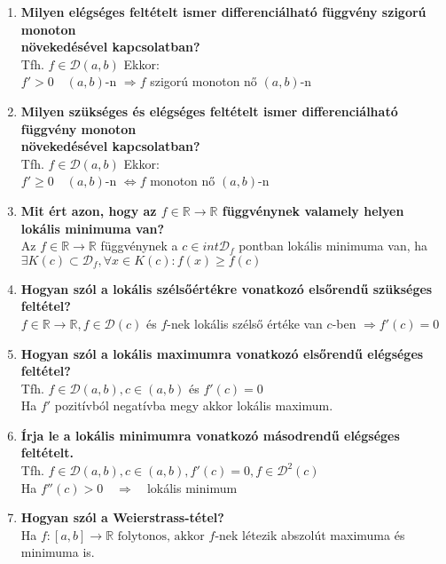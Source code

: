 \documentclass[a4paper,11pt]{article}
\begin{document}
\def\R{\mathbb{R}}
\def\cab{\in C[a,b]}
\def\dab{\in\D(a,b)}
\def\rtr{\R\to\R}
\def\D{\mathcal{D}}
\def\fda{f\in\D(a)}
\begin{enumerate}
	\item \textbf{Milyen elégséges feltételt ismer differenciálható függvény szigorú monoton \\ növekedésével kapcsolatban?}\\[0.2cm]Tfh. $f\dab$ Ekkor: \\[0.1cm]\hspace*{0.3cm} $f'>0\quad (a,b)$-n $\Rightarrow f$ szigorú monoton nő $(a,b)$-n
	\item \textbf{Milyen szükséges és elégséges feltételt ismer differenciálható függvény monoton \\ növekedésével kapcsolatban?}\\[0.2cm]Tfh. $f\dab$ Ekkor: \\[0.2cm]\hspace*{0.3cm} $f'\geq0\quad(a,b)$-n $\Leftrightarrow f$ monoton nő $(a,b)$-n
	\item \textbf{Mit ért azon, hogy az $f\in\rtr$ függvénynek valamely helyen lokális minimuma van?}\\[0.2cm]Az $f\in\rtr$ függvénynek a $c\in int\D_f$ pontban lokális minimuma van, ha\\[0.1cm]$\exists K(c)\subset\D_f,\forall x\in K(c): f(x)\geq f(c)$
	\item \textbf{Hogyan szól a lokális szélsőértékre vonatkozó elsőrendű szükséges feltétel?}\\[0.2cm]$f\in\rtr,f\in\D(c)$ és $f$-nek lokális szélső értéke van $c$-ben $\Rightarrow f'(c)=0$
	\item \textbf{Hogyan szól a lokális maximumra vonatkozó elsőrendű elégséges feltétel?}\\[0.2cm]Tfh. $f\dab,c\in(a,b)$ és $f'(c)=0$\\[0.1cm] Ha $f'$ pozitívból negatívba megy akkor lokális maximum.
	\item \textbf{Írja le a lokális minimumra vonatkozó másodrendű elégséges feltételt.}\\[0.2cm]Tfh. $f\dab,c\in(a,b),f'(c)=0, f\in\D^2(c)$\\[0.2cm] Ha $f''(c)>0\quad\Rightarrow\quad$lokális minimum
	\item \textbf{Hogyan szól a Weierstrass-tétel?}\\[0.2cm]Ha $ f:[a,b]\to\R\text{ folytonos, akkor } f$-nek létezik abszolút maximuma és minimuma is.
\end{enumerate}
\end{document}
